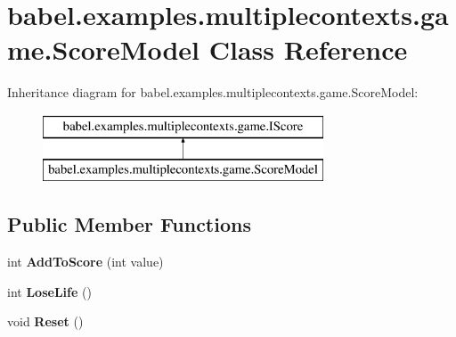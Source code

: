 \hypertarget{classbabel_1_1examples_1_1multiplecontexts_1_1game_1_1_score_model}{\section{babel.\-examples.\-multiplecontexts.\-game.\-Score\-Model Class Reference}
\label{classbabel_1_1examples_1_1multiplecontexts_1_1game_1_1_score_model}
}
Inheritance diagram for babel.\-examples.\-multiplecontexts.\-game.\-Score\-Model\-:\begin{figure}[H]
\begin{center}
\leavevmode
\includegraphics[height=2.000000cm]{classbabel_1_1examples_1_1multiplecontexts_1_1game_1_1_score_model}
\end{center}
\end{figure}
\subsection*{Public Member Functions}
\begin{DoxyCompactItemize}
\item 
\hypertarget{classbabel_1_1examples_1_1multiplecontexts_1_1game_1_1_score_model_ab8d51bff06e9bb91bb1418c0244db07b}{int {\bfseries Add\-To\-Score} (int value)}\label{classbabel_1_1examples_1_1multiplecontexts_1_1game_1_1_score_model_ab8d51bff06e9bb91bb1418c0244db07b}

\item 
\hypertarget{classbabel_1_1examples_1_1multiplecontexts_1_1game_1_1_score_model_a35c2a3958a259440cc5b6f0843912f84}{int {\bfseries Lose\-Life} ()}\label{classbabel_1_1examples_1_1multiplecontexts_1_1game_1_1_score_model_a35c2a3958a259440cc5b6f0843912f84}

\item 
\hypertarget{classbabel_1_1examples_1_1multiplecontexts_1_1game_1_1_score_model_ae8bb61f212e859ae682c1110b32207f9}{void {\bfseries Reset} ()}\label{classbabel_1_1examples_1_1multiplecontexts_1_1game_1_1_score_model_ae8bb61f212e859ae682c1110b32207f9}

\end{DoxyCompactItemize}
